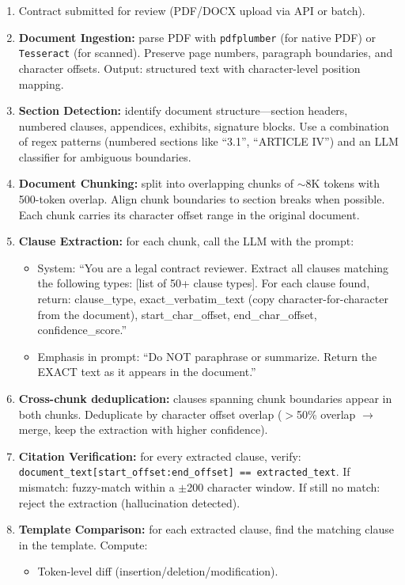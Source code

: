 \begin{enumerate}
  \item Contract submitted for review (PDF/DOCX upload via API or batch).
  \item \textbf{Document Ingestion:} parse PDF with \texttt{pdfplumber} (for native PDF) or \texttt{Tesseract} (for scanned). Preserve page numbers, paragraph boundaries, and character offsets. Output: structured text with character-level position mapping.
  \item \textbf{Section Detection:} identify document structure---section headers, numbered clauses, appendices, exhibits, signature blocks. Use a combination of regex patterns (numbered sections like ``3.1'', ``ARTICLE IV'') and an LLM classifier for ambiguous boundaries.
  \item \textbf{Document Chunking:} split into overlapping chunks of $\sim$8K tokens with 500-token overlap. Align chunk boundaries to section breaks when possible. Each chunk carries its character offset range in the original document.
  \item \textbf{Clause Extraction:} for each chunk, call the LLM with the prompt:
  \begin{itemize}
    \item System: ``You are a legal contract reviewer. Extract all clauses matching the following types: [list of 50+ clause types]. For each clause found, return: clause\_type, exact\_verbatim\_text (copy character-for-character from the document), start\_char\_offset, end\_char\_offset, confidence\_score.''
    \item Emphasis in prompt: ``Do NOT paraphrase or summarize. Return the EXACT text as it appears in the document.''
  \end{itemize}
  \item \textbf{Cross-chunk deduplication:} clauses spanning chunk boundaries appear in both chunks. Deduplicate by character offset overlap ($>$50\% overlap $\rightarrow$ merge, keep the extraction with higher confidence).
  \item \textbf{Citation Verification:} for every extracted clause, verify: \texttt{document\_text[start\_offset:end\_offset] == extracted\_text}. If mismatch: fuzzy-match within a $\pm$200 character window. If still no match: reject the extraction (hallucination detected).
  \item \textbf{Template Comparison:} for each extracted clause, find the matching clause in the template. Compute:
  \begin{itemize}
    \item Token-level diff (insertion/deletion/modification).

\end{itemize}
\end{enumerate}
